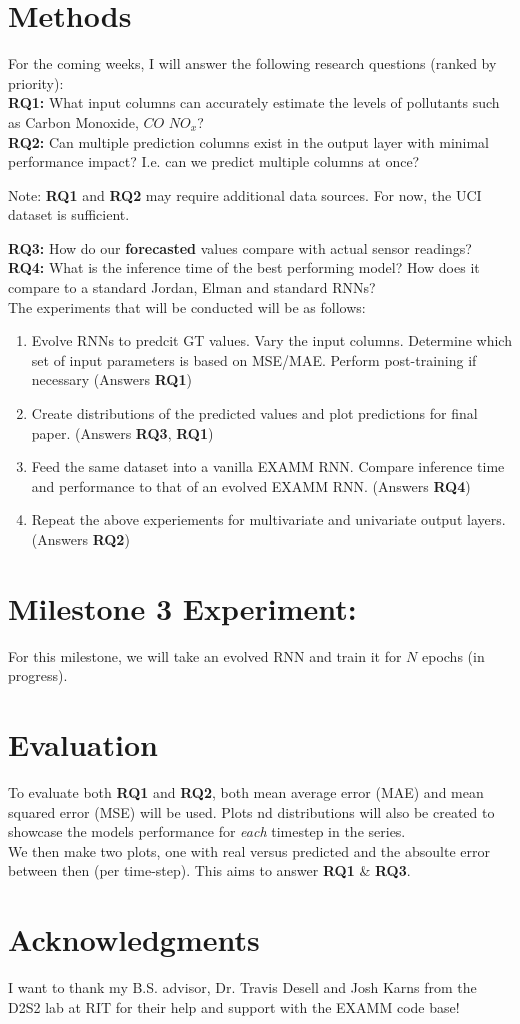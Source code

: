 \documentclass[12pt]{article}
\begin{document}
\section{Methods}
For the coming weeks, I will answer the following research questions (ranked by priority):\\
\textbf{RQ1:} What input columns can accurately estimate the levels of pollutants such as Carbon Monoxide, $CO$ $NO_x$? \\
\textbf{RQ2:} Can multiple prediction columns exist in the output layer with minimal performance impact? I.e. can we predict multiple columns at once? \\
\begin{footnotesize}
    Note: \textbf{RQ1} and \textbf{RQ2} may require additional data sources. For now, the UCI dataset is sufficient.\\
\end{footnotesize}
\textbf{RQ3:} How do our \textbf{forecasted} values compare with actual sensor readings?\\
\textbf{RQ4:} What is the inference time of the best performing model? How does it compare to a standard Jordan, Elman and standard RNNs? \\
The experiments that will be conducted will be as follows:
\begin{enumerate}
    \item
        Evolve RNNs to predcit GT values. Vary the input columns. Determine which set of input parameters is  based on MSE/MAE. Perform post-training if necessary (Answers \textbf{RQ1})
    \item
        Create distributions of the predicted values and plot predictions for final paper. (Answers \textbf{RQ3}, \textbf{RQ1})
    \item
        Feed the same dataset into a vanilla EXAMM RNN. Compare inference time and performance to that of an evolved EXAMM RNN. (Answers \textbf{RQ4})
    \item
        Repeat the above experiements for multivariate and univariate output layers. (Answers \textbf{RQ2})
\end{enumerate}

\section{Milestone 3 Experiment:}
For this milestone, we will take an evolved RNN and train it for $N$ epochs (in progress). 

\section{Evaluation}
To evaluate both \textbf{RQ1} and \textbf{RQ2}, both mean average error (MAE) and mean squared error (MSE) will be used. Plots nd distributions will also be created to showcase the models performance for \textit{each} timestep in the series.\\
We then make two plots, one with real versus predicted and the absoulte error between then (per time-step).
This aims to answer \textbf{RQ1} \& \textbf{RQ3}.

\section{Acknowledgments}
I want to thank my B.S. advisor, Dr. Travis Desell and Josh Karns from the D2S2 lab at RIT for their help and support with the EXAMM code base!

\end{document}
